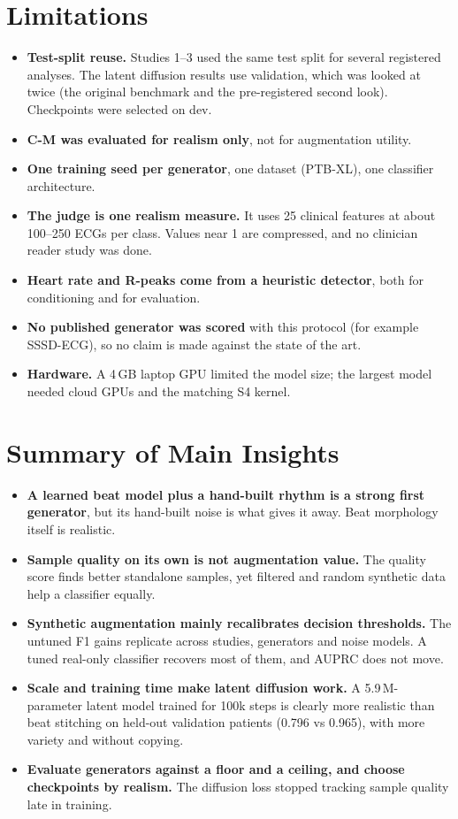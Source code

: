 \documentclass[11pt,a4paper]{article}
\begin{document}
\section{Limitations}
\begin{itemize}
\item \textbf{Test-split reuse.} Studies 1--3 used the same test split for several registered analyses. The latent
  diffusion results use validation, which was looked at twice (the original benchmark and the pre-registered second
  look). Checkpoints were selected on dev.
\item \textbf{C-M was evaluated for realism only}, not for augmentation utility.
\item \textbf{One training seed per generator}, one dataset (PTB-XL), one classifier architecture.
\item \textbf{The judge is one realism measure.} It uses 25 clinical features at about 100--250 ECGs per class.
  Values near 1 are compressed, and no clinician reader study was done.
\item \textbf{Heart rate and R-peaks come from a heuristic detector}, both for conditioning and for evaluation.
\item \textbf{No published generator was scored} with this protocol (for example SSSD-ECG), so no claim is made
  against the state of the art.
\item \textbf{Hardware.} A 4\,GB laptop GPU limited the model size; the largest model needed cloud GPUs and the
  matching S4 kernel.
\end{itemize}

\clearpage
\section{Summary of Main Insights}
\begin{itemize}
\item \textbf{A learned beat model plus a hand-built rhythm is a strong first generator}, but its hand-built noise is
  what gives it away. Beat morphology itself is realistic.
\item \textbf{Sample quality on its own is not augmentation value.} The quality score finds better standalone
  samples, yet filtered and random synthetic data help a classifier equally.
\item \textbf{Synthetic augmentation mainly recalibrates decision thresholds.} The untuned F1 gains replicate across
  studies, generators and noise models. A tuned real-only classifier recovers most of them, and AUPRC does not move.
\item \textbf{Scale and training time make latent diffusion work.} A 5.9\,M-parameter latent model trained for 100k
  steps is clearly more realistic than beat stitching on held-out validation patients (0.796 vs 0.965), with more
  variety and without copying.
\item \textbf{Evaluate generators against a floor and a ceiling, and choose checkpoints by realism.} The diffusion
  loss stopped tracking sample quality late in training.
\end{itemize}
\end{document}
